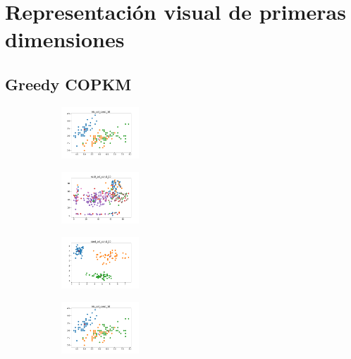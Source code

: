 \appendix

\section{Representación visual de primeras dimensiones}

\subsection{Greedy COPKM}

\begin{figure}[H]    
    \centering
    \begin{subfigure}
        \centering
        \includegraphics[width=0.32\textwidth]{img/copkm/iris_set_const_10_949004259_clust.png}
    \end{subfigure}
    \hfill
    \begin{subfigure}
        \centering
        \includegraphics[width=0.32\textwidth]{img/copkm/ecoli_set_const_10_949004259_clust.png}
    \end{subfigure}
    \hfill
    \begin{subfigure}
        \centering
        \includegraphics[width=0.32\textwidth]{img/copkm/rand_set_const_10_949004259_clust.png}
    \end{subfigure}
    \hfill
    \begin{subfigure}
        \centering
        \includegraphics[width=0.32\textwidth]{img/copkm/iris_set_const_10_589741062_clust.png}

\end{subfigure}
\end{figure}
